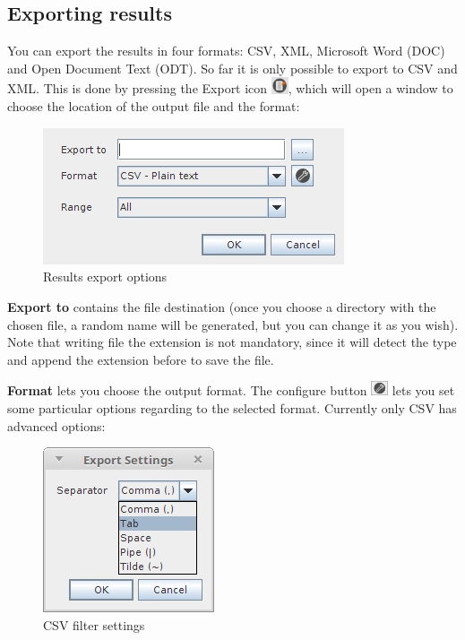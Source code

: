 \documentclass[a4paper]{article}
\begin{document}
	\subsection{Exporting results}
	You can export the results in four formats: CSV, XML, Microsoft Word (DOC) and Open Document Text (ODT). So far it is only possible to export to CSV and XML. This is done by pressing the Export icon \includegraphics[width=0.5cm]{img/icon_export.png}, which will open a window to choose the location of the output file and the format:
	\begin{figure}[h!]
		\centering
		\includegraphics[width=0.5\linewidth]{img/query_result_exportmenu.png}
		\caption{Results export options}
		\label{fig:query_result_exportmenu}
	\end{figure}
	
	\textbf{Export to} contains the file destination (once you choose a directory with the chosen file, a random name will be generated, but you can change it as you wish). Note that writing file the extension is not mandatory, since it will detect the type and append the extension before to save the file.  
	
	\textbf{Format} lets you choose the output format. The configure button \includegraphics[width=0.5cm]{img/icon_edit_saved_query.png} lets you set some particular options regarding to the selected format. Currently only CSV has advanced options:		
	\begin{figure}[h!]
		\centering
		\includegraphics[width=0.3\linewidth]{img/query_exports_settings.png}
		\caption{CSV filter settings}
		\label{fig:query_exports_settings}
	\end{figure}
	
\end{document}
